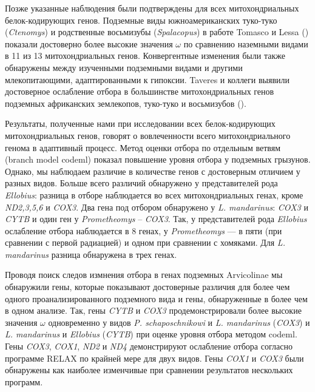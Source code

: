 Позже указанные наблюдения были подтверждены для всех митохондриальных белок-кодирующих генов. Подземные виды южноамериканских туко-туко (\textit{Ctenomys}) и родственные восьмизубы (\textit{Spalacopus}) в работе Tomasco и Lessa (\cite{Tomasco2011}) показали достоверно более высокие значения $\omega$ по сравнению наземными видами в 11 из 13 митохондриальных генов. Конвергентные изменения были также обнаружены между изученными подземными видами и другими млекопитающими, адаптированными к гипоксии. Taveres и коллеги выявили достоверное ослабление отбора в большинстве митохондриальных генов подземных африканских землекопов, туко-туко и восьмизубов (\cite{Tavares2018}). 


Результаты, полученные нами при исследовании всех белок-кодирующих митохондриальных генов, говорят о вовлеченности всего митохондриального генома в адаптивный процесс. Метод оценки отбора по отдельным ветвям (branch model codeml) показал повышение уровня отбора у подземных грызунов. Однако, мы наблюдаем различие в количестве генов с достоверным отличием у разных видов. Больше всего различий обнаружено у представителей рода \textit{Ellobius}: разница в отборе наблюдается во всех митохондриальных генах, кроме \textit{ND2,3,5,6} и \textit{COX3}. Два гена под отбором обнаружено у \textit{L. mandarinus}: \textit{COX3} и \textit{CYTB} и один ген у \textit{Prometheomys} -- \textit{COX3}. Так, у представителей рода \textit{Ellobius} ослабление отбора наблюдается в 8 генах, у \textit{Prometheomys} --- в пяти (при сравнении с первой радиацией) и одном при сравнении с хомяками. Для \textit{L. mandarinus} разница обнаружена в трех генах.  

Проводя поиск следов измнения отбора в генах подземных Arvicolinae мы обнаружили гены, которые показывают достоверные различия для более чем одного проанализированного подземного вида и гены, обнаруженные в более чем в одном анализе. Так, гены \textit{CYTB} и \textit{COX3} продемонстрировали более высокие значения $\omega$ одновременно у видов \textit{P. schaposchnikowi} и \textit{L. mandarinus} (\textit{COX3}) и \textit{L. mandarinus} и \textit{Ellobius} (\textit{CYTB}) при оценке уровня отбора методом codeml. Гены \textit{COX3}, \textit{COX1}, \textit{ND2} и \textit{ND4} демонстрируют ослабление отбора согласно программе RELAX по крайней мере для двух видов. Гены \textit{COX1} и \textit{COX3} были обнаружены как наиболее изменчивые при сравнении результатов нескольких программ. 


